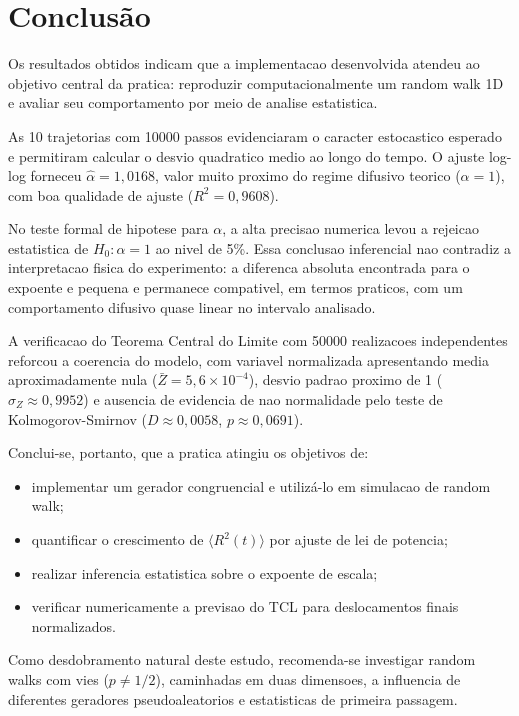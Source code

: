 \vspace{1em}


\chapter{Conclusão}
\label{chap_conclusao}

Os resultados obtidos indicam que a implementacao desenvolvida atendeu ao objetivo central da pratica: reproduzir computacionalmente um random walk 1D e avaliar seu comportamento por meio de analise estatistica.

As 10 trajetorias com 10000 passos evidenciaram o caracter estocastico esperado e permitiram calcular o desvio quadratico medio ao longo do tempo. O ajuste log-log forneceu $\hat{\alpha}=1{,}0168$, valor muito proximo do regime difusivo teorico ($\alpha=1$), com boa qualidade de ajuste ($R^2=0{,}9608$).

No teste formal de hipotese para $\alpha$, a alta precisao numerica levou a rejeicao estatistica de $H_0: \alpha=1$ ao nivel de 5\%. Essa conclusao inferencial nao contradiz a interpretacao fisica do experimento: a diferenca absoluta encontrada para o expoente e pequena e permanece compativel, em termos praticos, com um comportamento difusivo quase linear no intervalo analisado.

A verificacao do Teorema Central do Limite com 50000 realizacoes independentes reforcou a coerencia do modelo, com variavel normalizada apresentando media aproximadamente nula ($\bar{Z}=5{,}6\times10^{-4}$), desvio padrao proximo de 1 ($\sigma_Z\approx 0,9952$) e ausencia de evidencia de nao normalidade pelo teste de Kolmogorov-Smirnov ($D\approx 0,0058$, $p\approx 0,0691$).

Conclui-se, portanto, que a pratica atingiu os objetivos de:
\begin{itemize}
    \item implementar um gerador congruencial e utilizá-lo em simulacao de random walk;
    \item quantificar o crescimento de $\langle R^2(t)\rangle$ por ajuste de lei de potencia;
    \item realizar inferencia estatistica sobre o expoente de escala;
    \item verificar numericamente a previsao do TCL para deslocamentos finais normalizados.
\end{itemize}

Como desdobramento natural deste estudo, recomenda-se investigar random walks com vies ($p\neq 1/2$), caminhadas em duas dimensoes, a influencia de diferentes geradores pseudoaleatorios e estatisticas de primeira passagem.

